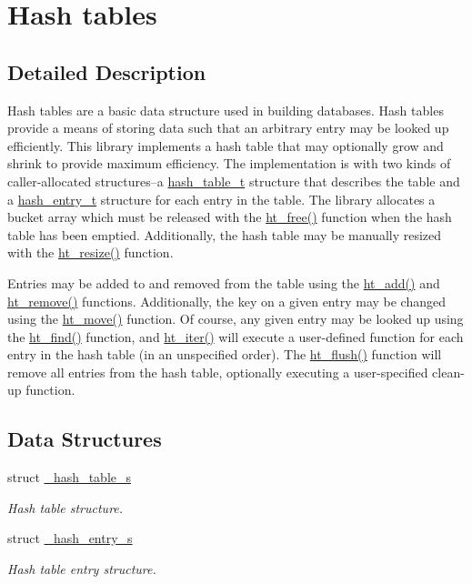 \hypertarget{group__dbprim__hash}{
\section{Hash tables}
\label{group__dbprim__hash}
}


\subsection{Detailed Description}
Hash tables are a basic data structure used in building databases. Hash tables provide a means of storing data such that an arbitrary entry may be looked up efficiently. This library implements a hash table that may optionally grow and shrink to provide maximum efficiency. The implementation is with two kinds of caller-allocated structures--a \hyperlink{group__dbprim__hash_ga1}{hash\_\-table\_\-t} structure that describes the table and a \hyperlink{group__dbprim__hash_ga2}{hash\_\-entry\_\-t} structure for each entry in the table. The library allocates a bucket array which must be released with the \hyperlink{group__dbprim__hash_ga18}{ht\_\-free()} function when the hash table has been emptied. Additionally, the hash table may be manually resized with the \hyperlink{group__dbprim__hash_ga17}{ht\_\-resize()} function.

Entries may be added to and removed from the table using the \hyperlink{group__dbprim__hash_ga11}{ht\_\-add()} and \hyperlink{group__dbprim__hash_ga13}{ht\_\-remove()} functions. Additionally, the key on a given entry may be changed using the \hyperlink{group__dbprim__hash_ga12}{ht\_\-move()} function. Of course, any given entry may be looked up using the \hyperlink{group__dbprim__hash_ga14}{ht\_\-find()} function, and \hyperlink{group__dbprim__hash_ga15}{ht\_\-iter()} will execute a user-defined function for each entry in the hash table (in an unspecified order). The \hyperlink{group__dbprim__hash_ga16}{ht\_\-flush()} function will remove all entries from the hash table, optionally executing a user-specified clean-up function.

\subsection*{Data Structures}
\begin{CompactItemize}
\item 
struct \hyperlink{struct__hash__table__s}{\_\-hash\_\-table\_\-s}
\begin{CompactList}\small\item\em Hash table structure. \item\end{CompactList}\item 
struct \hyperlink{struct__hash__entry__s}{\_\-hash\_\-entry\_\-s}
\begin{CompactList}\small\item\em Hash table entry structure. \item\end{CompactList}\end{CompactItemize}

